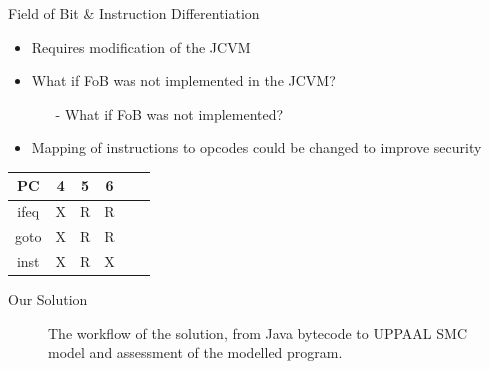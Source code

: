 \begin{frame}[fragile]{Field of Bit \& Instruction Differentiation}
\begin{itemize}
\item Requires modification of the JCVM
\item What if FoB was not implemented in the JCVM?
\begin{itemize}
\item[-] What if FoB was not implemented?
\end{itemize}
\item Mapping of instructions to opcodes could be changed to improve security
\end{itemize}
\begin{table}
\centering
\begin{tabular}{|c|c|c|c|c|c|}
\hline PC & 4 & 5 & 6   \\ 
\hline ifeq & X & R & R \\ 
\hline goto & X & R & R \\ 
\hline inst & X & R & X \\ 
\hline 
\end{tabular} 
\end{table}
\end{frame}

\begin{frame}[fragile]{Our Solution}
\begin{center}
\begin{figure}
\def\svgwidth{\columnwidth}

\caption{The workflow of the solution, from Java bytecode to UPPAAL SMC model and assessment of the modelled program.}
\label{fig:workflow_new}
\end{figure}
\end{center}
\end{frame}


